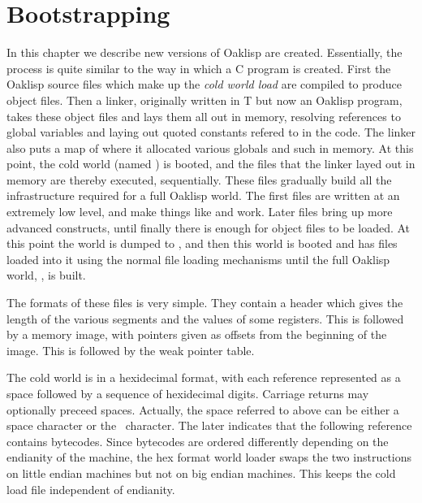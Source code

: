 %
%
%


\chapter{Bootstrapping}

In this chapter we describe new versions of Oaklisp are created.
Essentially, the process is quite similar to the way in which a C
program is created.  First the Oaklisp source files which make up the
\emph{cold world load} are compiled to produce object files.  Then a
linker, originally written in T but now an Oaklisp program, takes
these object files and lays them all out in memory, resolving
references to global variables and laying out quoted constants refered
to in the code.  The linker also puts a map of where it allocated
various globals and such in memory.  At this point, the cold world
(named ) is booted, and the files that the linker
layed out in memory are thereby executed, sequentially.  These files
gradually build all the infrastructure required for a full Oaklisp
world.  The first files are written at an extremely low level, and
make things like  and  work.  Later files bring up
more advanced constructs, until finally there is enough for object
files to be loaded.  At this point the world is dumped to
, and then this world is booted and has files loaded
into it using the normal file loading mechanisms until the full
Oaklisp world, , is built.

The formats of these files is very simple.  They contain a header
which gives the length of the various segments and the values of some
registers.  This is followed by a memory image, with pointers given as
offsets from the beginning of the image.  This is followed by the weak
pointer table.

The cold world is in a hexidecimal format, with each reference
represented as a space followed by a sequence of hexidecimal digits.
Carriage returns may optionally preceed spaces.  Actually, the space
referred to above can be either a space character or the \upar\
character.  The later indicates that the following reference contains
bytecodes.  Since bytecodes are ordered differently depending on the
endianity of the machine, the hex format world loader swaps the two
instructions on little endian machines but not on big endian machines.
This keeps the cold load file independent of endianity.

